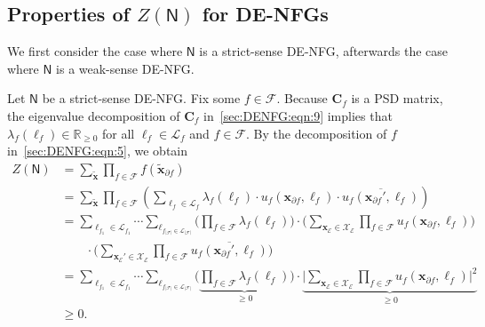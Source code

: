 \documentclass[journal]{IEEEtran}
\newcommand{\add}[1]{{\color{black}#1}}
\newcommand{\vect}[1]{ \bm{#1} }
\newcommand{\set}[1]{\mathcal{#1}}
\newcommand{\setEfull}{ \mathcal{E} }
\newcommand{\setF}{ \mathcal{F} }
\newcommand{\setpf}{ \partial f }
\newcommand{\sR}{\mathbb{R}}
\newcommand{\setx}{ \mathcal{X} }
\newcommand{\vx}{ \vect{x} }
\newcommand{\graphN}{ \mathsf{N} }
\newcommand{\matr}[1]{\vect{#1}}
\newcommand{\tvx}{ \tilde{\vect{x}}  }
\begin{document}
\begin{appendices}

  \section{Properties of \texorpdfstring{$Z(\graphN)$}{} for DE-NFGs}
  \label{apx:property of ZN}

  We first consider the case where $\graphN$ is a strict-sense DE-NFG,
  afterwards the case where $\graphN$ is a weak-sense DE-NFG.

  Let $\graphN$ be a strict-sense DE-NFG. Fix some $f \in \setF$. Because
  $\matr{C}_f$ is a PSD matrix, the eigenvalue decomposition of $ \matr{C}_f  $ in~\eqref{sec:DENFG:eqn:9} implies that $ \lambda_{f}(\ell_f) \in \sR_{\geq 0} $ for all $\ell_f \in \set{L}_f$ and $ f \in \setF $.
  \add{By the decomposition of $ f $ in~\eqref{sec:DENFG:eqn:5}, we obtain}
  \begin{align*}
    Z(\graphN)
     & = \sum_{\tvx}
    \prod_{f \in \setF}
    f(\tvx_{\setpf})                                  \\
     & = \sum_{\tvx}
    \prod_{f \in \setF}
    \left(
    \sum_{\ell_f \in \set{L}_f}
    \lambda_{f}(\ell_f) \cdot
    u_{f}(\vx_{\setpf},\ell_f)
    \cdot
    \overline{ u_{f}(\vx_{\setpf}',\ell_f) }
    \right)                                           \\
     & = \!\!\!\! \sum_{\ell_{f_1} \in \set{L}_{f_1}}
    \!\!\!\!\cdots \!\!\!\!
    \sum_{\ell_{f_{|\setF|} \in \set{L}_{|\setF|}}}
    \!\!\!
    \Biggl( \prod_{f \in \setF} \lambda_{f}(\ell_f) \Biggr)
    \!\!\cdot\!\!
    \Biggl(
    \sum_{ \vx_{\setEfull} \in \setx_{\setEfull} }
    \prod_{f \in \setF} u_{f}(\vx_{\setpf},\ell_f)
    \Biggr)                                           \\
     & \qquad \cdot
    \Biggl(
    \sum_{ \vx_{\setEfull}' \in \setx_{\setEfull} }
    \prod_{f \in \setF}
    \overline{u_{f}(\vx_{\setpf}',\ell_f)}
    \Biggr)
    \\
     & = \!\!\!\! \sum_{\ell_{f_1} \in \set{L}_{f_1}}
    \!\!\!\!\cdots\!\!\!\!
    \sum_{\ell_{f_{|\setF|} \in \set{L}_{|\setF|}}}
    \!\!\!\Biggl(
    \underbrace{
      \prod_{f \in \setF}
      \lambda_{f}(\ell_f)
    }_{\geq 0} \Biggr)
    \!\!\cdot\!\!
    \underbrace{
      \Biggl|
      \sum_{ \vx_{\setEfull} \in \setx_{\setEfull} }
      \prod_{f \in \setF} u_{f}(\vx_{\setpf},\ell_f)
      \Biggr|^{2}
    }_{\geq 0}
    \nonumber                                         \\
     & \geq 0.
  \end{align*}


\end{appendices}
\end{document}
